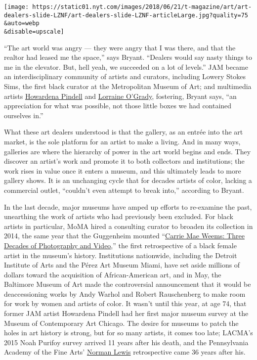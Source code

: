 \texttt{[image: https://static01.nyt.com/images/2018/06/21/t-magazine/art/art-dealers-slide-LZNF/art-dealers-slide-LZNF-articleLarge.jpg?quality=75\\\&auto=webp\\\&disable=upscale]}

``The art world was angry --- they were angry that I was there, and that
the realtor had leased me the space,'' says Bryant. ``Dealers would say
nasty things to me in the elevator. But, hell yeah, we succeeded on a
lot of levels.'' JAM became an interdisciplinary community of artists
and curators, including Lowery Stokes Sims, the first black curator at
the Metropolitan Museum of Art; and multimedia artists
\href{http://www.garthgreenan.com/artists/howardena-pindell}{Howardena
Pindell} and \href{http://lorraineogrady.com/}{Lorraine O'Grady},
fostering, Bryant says, ``an appreciation for what was possible, not
those little boxes we had contained ourselves in.''

What these art dealers understood is that the gallery, as an entrée into
the art market, is the sole platform for an artist to make a living. And
in many ways, galleries are where the hierarchy of power in the art
world begins and ends. They discover an artist's work and promote it to
both collectors and institutions; the work rises in value once it enters
a museum, and this ultimately leads to more gallery shows. It is an
unchanging cycle that for decades artists of color, lacking a commercial
outlet, ``couldn't even attempt to break into,'' according to Bryant.

In the last decade, major museums have amped up efforts to re-examine
the past, unearthing the work of artists who had previously been
excluded. For black artists in particular, MoMA hired a consulting
curator to broaden its collection in 2014, the same year that the
Guggenheim mounted
``\href{https://www.guggenheim.org/exhibition/carrie-mae-weems-three-decades-of-photography-and-video}{Carrie
Mae Weems: Three Decades of Photography and Video},'' the first
retrospective of a black female artist in the museum's history.
Institutions nationwide, including the Detroit Institute of Arts and the
Pérez Art Museum Miami, have set aside millions of dollars toward the
acquisition of African-American art, and in May, the Baltimore Museum of
Art made the controversial announcement that it would be deaccessioning
works by Andy Warhol and Robert Rauschenberg to make room for work by
women and artists of color. It wasn't until this year, at age 74, that
former JAM artist Howardena Pindell had her first major museum survey at
the Museum of Contemporary Art Chicago. The desire for museums to patch
the holes in art history is strong, but for so many artists, it comes
too late; LACMA's 2015 Noah Purifoy survey arrived 11 years after his
death, and the Pennsylvania Academy of the Fine Arts'
\href{https://www.pafa.org/normanlewis}{Norman Lewis} retrospective came
36 years after his.

